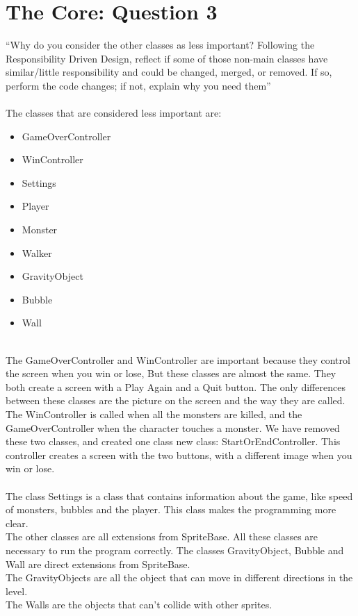\chapter{The Core: Question 3}
``Why do you consider the other classes as less important? Following the Responsibility Driven Design,
reflect if some of those non-main classes have similar/little responsibility and could be changed,
merged, or removed. If so, perform the code changes; if not, explain why you need them''\\
\\
The classes that are considered less important are:
\begin{itemize}
	\item GameOverController
	\item WinController
	\item Settings
	\item Player
	\item Monster
	\item Walker
	\item GravityObject
	\item Bubble
	\item Wall
\end{itemize}
\\
The GameOverController and WinController are important because they control the screen when you win or lose, But these classes are almost the same. They both create a screen with a Play Again and a Quit button. The only differences between these classes are the picture on the screen and the way they are called. The WinController is called when all the monsters are killed, and the GameOverController when the character touches a monster. We have removed these two classes, and created one class new class: StartOrEndController. This controller creates a screen with the two buttons, with a different image when you win or lose.\\
\\
The class Settings is a class that contains information about the game, like speed of monsters, bubbles and the player. This class makes the programming more clear.
\\
The other classes are all extensions from SpriteBase. All these classes are necessary to run the program correctly. The classes GravityObject, Bubble and Wall are direct extensions from SpriteBase.\\
The GravityObjects are all the object that can move in different directions in the level.\\
The Walls are the objects that can't collide with other sprites.\\
